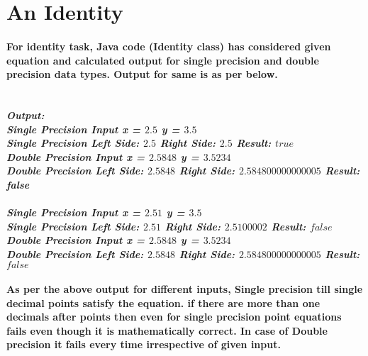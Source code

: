 \documentclass[12pt]{article}
\begin{document}
\section{An Identity}
\paragraph{For identity task, Java code (Identity class) has considered given equation and calculated output for single precision and double precision data types. Output for same is as per below. \\
}
\textbf{\textit{\\ Output:\\
Single Precision Input x = $2.5$  y = $3.5$ \\
Single Precision Left Side: $2.5$  Right Side: $2.5$  Result: $true$ \\
Double Precision Input x = $2.5848$  y = $3.5234$ \\
Double Precision Left Side: $2.5848$  Right Side:  $2.584800000000005$  Result: false \\ \\
Single Precision Input x = $2.51$  y = $3.5$ \\
Single Precision Left Side: $2.51$  Right Side: $2.5100002$  Result: $false$ \\
Double Precision Input x = $2.5848$  y = $3.5234$ \\
Double Precision Left Side: $2.5848$  Right Side: $2.584800000000005$  Result: $false$ \\ }}
\paragraph{As per the above output for different inputs, Single precision till single decimal points satisfy the equation. if there are more than one decimals after points then even for single precision point equations fails even though it is mathematically correct. In case of Double precision it fails every time irrespective of given input.}
\end{document}
